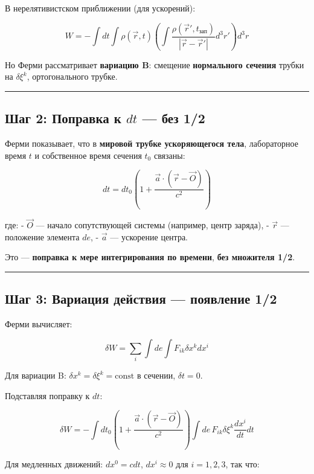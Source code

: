 \documentclass[11pt]{article}
\begin{document}
В нерелятивистском приближении (для ускорений):

\[
W = - \int dt \int \rho(\vec{r}, t) \left( \int \frac{\rho(\vec{r}', t_{\text{зап}})}{|\vec{r} - \vec{r}'|} d^3r' \right) d^3r
\]

Но Ферми рассматривает \textbf{вариацию B}: смещение \textbf{нормального
сечения} трубки на \(\delta \xi^k\), ортогонального трубке.

\begin{center}\rule{0.5\linewidth}{\linethickness}\end{center}

\subsection{\texorpdfstring{ Шаг 2: Поправка к \(dt\) --- без 1/2}{ Шаг 2: Поправка к dt --- без 1/2}}

Ферми показывает, что в \textbf{мировой трубке ускоряющегося тела},
лабораторное время \(t\) и собственное время сечения \(t_0\) связаны:

\[
dt = dt_0 \left( 1 + \frac{\vec{a} \cdot (\vec{r} - \vec{O})}{c^2} \right)
\]

где: - \(\vec{O}\) --- начало сопутствующей системы (например, центр
заряда), - \(\vec{r}\) --- положение элемента \(de\), - \(\vec{a}\) ---
ускорение центра.

 Это --- \textbf{поправка к мере интегрирования по времени},
\textbf{без множителя 1/2}.

\begin{center}\rule{0.5\linewidth}{\linethickness}\end{center}

\subsection{ Шаг 3: Вариация действия --- появление 1/2}

Ферми вычисляет:

\[
\delta W = \sum_i \int de \int F_{ik} \delta x^k dx^i
\]

Для вариации B: \(\delta x^k = \delta \xi^k = \text{const в сечении}\),
\(\delta t = 0\).

Подставляя поправку к \(dt\):

\[
\delta W = - \int dt_0 \left( 1 + \frac{\vec{a} \cdot (\vec{r} - \vec{O})}{c^2} \right) \int de \, F_{ik} \delta \xi^k \frac{dx^i}{dt} dt
\]

Для медленных движений: \(dx^0 = c dt\), \(dx^i \approx 0\) для
\(i=1,2,3\), так что:
\end{document}
